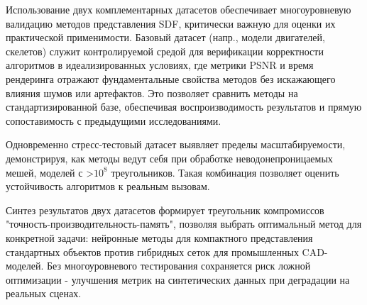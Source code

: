 \documentclass[a4paper,hidelinks,12pt]{article}
\begin{document}
Использование двух комплементарных датасетов обеспечивает многоуровневую валидацию методов представления SDF, критически важную 
для оценки их практической применимости. Базовый датасет (напр., модели двигателей, скелетов) служит контролируемой средой 
для верификации корректности алгоритмов в идеализированных условиях, где метрики PSNR и время рендеринга отражают фундаментальные 
свойства методов без искажающего влияния шумов или артефактов. Это позволяет сравнить методы на стандартизированной базе, 
обеспечивая воспроизводимость результатов и прямую сопоставимость с предыдущими исследованиями.

Одновременно стресс-тестовый датасет выявляет пределы масштабируемости, демонстрируя, как методы ведут себя при обработке 
неводонепроницаемых мешей, моделей с >$10^8$ треугольников. Такая комбинация позволяет оценить устойчивость алгоритмов к реальным вызовам.

Синтез результатов двух датасетов формирует треугольник компромиссов "точность-производительность-память", 
позволяя выбрать оптимальный метод для конкретной задачи: нейронные методы для компактного представления стандартных 
объектов против гибридных сеток для промышленных CAD-моделей. Без многоуровневого тестирования сохраняется риск 
ложной оптимизации - улучшения метрик на синтетических данных при деградации на реальных сценах.
\end{document}
